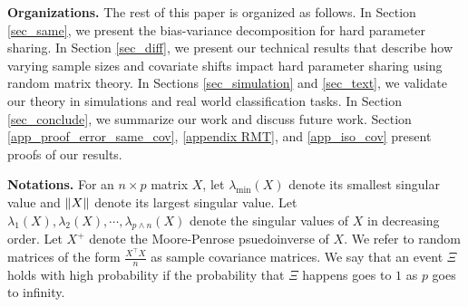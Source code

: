 


\textbf{Organizations.}
The rest of this paper is organized as follows.
In Section \ref{sec_same}, we present the bias-variance decomposition for hard parameter sharing.
In Section \ref{sec_diff}, we present our technical results that describe how varying sample sizes and covariate shifts impact hard parameter sharing using random matrix theory.
In Sections \ref{sec_simulation} and \ref{sec_text}, we validate our theory in simulations and real world classification tasks.
In Section \ref{sec_conclude}, we summarize our work and discuss future work.
Section \ref{app_proof_error_same_cov}, \ref{appendix RMT}, and \ref{app_iso_cov} present proofs of our results.

\textbf{Notations.}
For an $n\times p$ matrix $X$, let $\lambda_{\min}(X)$ denote its smallest singular value and $\|X\|$ denote its largest singular value.
Let $\lambda_1(X), \lambda_2(X), \cdots, \lambda_{p\wedge n}(X)$ denote the singular values of $X$ in decreasing order.
Let $X^+$ denote the Moore-Penrose psuedoinverse of $X$.
We refer to random matrices of the form $\frac {X^\top X} n$ as sample covariance matrices.
We say that an event $\Xi$ holds with high probability if the probability that $\Xi$ happens goes to $1$ as $p$ goes to infinity.
